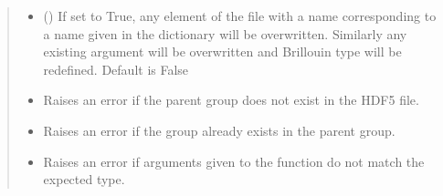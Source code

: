 \documentclass[letterpaper,10pt,english]{sphinxmanual}
\begin{document}
\begin{fulllineitems}
\begin{fulllineitems}
\begin{quote}
\begin{description}
\begin{itemize}
\item {} 
\sphinxAtStartPar
{} (\sphinxstyleliteralemphasis{\sphinxupquote{, }}) \textendash{} If set to True, any element of the file with a name corresponding to a name given in the dictionary will be overwritten. Similarly any existing argument will be overwritten and Brillouin type will be redefined. Default is False

\end{itemize}

\begin{itemize}
\item {} 
\sphinxAtStartPar
{\hyperref[\detokenize{source/HDF5_BLS:HDF5_BLS.WrapperError.WrapperError_StructureError}]{}} \textendash{} Raises an error if the parent group does not exist in the HDF5 file.

\item {} 
\sphinxAtStartPar
{\hyperref[\detokenize{source/HDF5_BLS:HDF5_BLS.WrapperError.WrapperError_Overwrite}]{}} \textendash{} Raises an error if the group already exists in the parent group.

\item {} 
\sphinxAtStartPar
{\hyperref[\detokenize{source/HDF5_BLS:HDF5_BLS.WrapperError.WrapperError_ArgumentType}]{}} \textendash{} Raises an error if arguments given to the function do not match the expected type.

\end{itemize}

\end{description}\end{quote}

\end{fulllineitems}



\end{fulllineitems}
\end{document}
